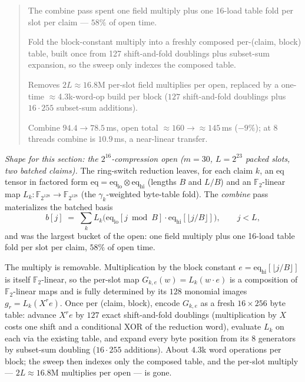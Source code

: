 \documentclass[11pt]{article}
\newcommand{\Ftwo}{\mathbb{F}_2}
\newcommand{\Fbig}{\mathbb{F}_{2^{128}}}
\newcommand{\eq}{\mathrm{eq}}
\newenvironment{optsummary}{%
  \begin{quote}\small
  \begin{description}
  \setlength{\itemsep}{1pt}\setlength{\parsep}{0pt}\setlength{\topsep}{2pt}
}{%
  \end{description}
  \end{quote}
}
\begin{document}
\begin{optsummary}
\item[Baseline:] The combine pass spent one field multiply plus one 16-load table fold per slot per claim --- $58\%$ of open time.
\item[Improvement:] Fold the block-constant multiply into a freshly composed per-(claim, block) table, built once from 127 shift-and-fold doublings plus subset-sum expansion, so the sweep only indexes the composed table.
\item[Mechanism:] Removes $2L\approx16.8$M per-slot field multiplies per open, replaced by a one-time $\approx$4.3k-word-op build per block ($127$ shift-and-fold doublings plus $16\cdot255$ subset-sum additions).
\item[Result:] Combine $94.4\to78.5\,$ms, open total $\approx160\to\approx145\,$ms ($-9\%$); at 8 threads combine is $10.9\,$ms, a near-linear transfer.
\end{optsummary}

\emph{Shape for this section: the $2^{16}$-compression open ($m=30$,
$L=2^{23}$ packed slots, two batched claims).} The ring-switch reduction
leaves, for each claim $k$, an eq tensor in factored form
$\eq = \mathrm{eq}_{\mathrm{lo}} \otimes \mathrm{eq}_{\mathrm{hi}}$
(lengths $B$ and $L/B$) and an $\Ftwo$-linear map
$L_k:\Fbig\to\Fbig$ (the $\gamma_k$-weighted byte-table fold). The
\emph{combine} pass materializes the batched basis
\[
b[j] \;=\; \sum_k L_k\bigl(\mathrm{eq}_{\mathrm{lo}}[j \bmod B]\cdot
                            \mathrm{eq}_{\mathrm{hi}}[\lfloor j/B\rfloor]\bigr),
\qquad j < L,
\]
and was the largest bucket of the open: one field multiply plus one
16-load table fold per slot per claim, $58\%$ of open time.

The multiply is removable. Multiplication by the block constant
$e=\mathrm{eq}_{\mathrm{hi}}[\lfloor j/B\rfloor]$ is itself $\Ftwo$-linear, so
the per-slot map $G_{k,e}(w) = L_k(w\cdot e)$ is a composition of
$\Ftwo$-linear maps and is fully determined by its $128$ monomial images
$g_r = L_k(X^r e)$. Once per (claim, block), encode $G_{k,e}$ as a fresh
$16\times256$ byte table: advance $X^r e$ by $127$ exact shift-and-fold
doublings (multiplication by $X$ costs one shift and a conditional XOR of the
reduction word), evaluate $L_k$ on each via the existing table, and expand
every byte position from its $8$ generators by subset-sum doubling
($16\cdot255$ additions). About $4.3$k word operations per block; the sweep
then indexes only the composed table, and the per-slot multiply --- $2L
\approx 16.8$M multiplies per open --- is gone.
\end{document}
